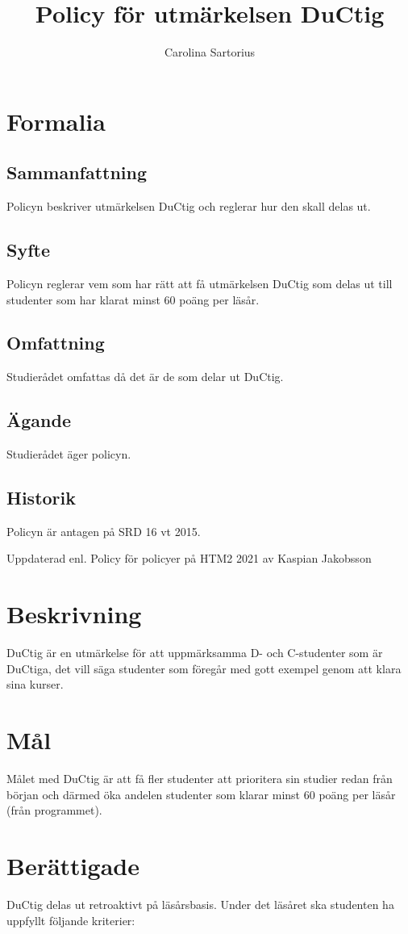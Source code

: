 \documentclass{dsekprotokoll}
\title{Policy för utmärkelsen DuCtig}
\author{Carolina Sartorius}
\begin{document}
\maketitle

\section{Formalia}
\subsection{Sammanfattning}
Policyn beskriver utmärkelsen DuCtig och reglerar hur den skall delas ut.
\subsection{Syfte}
Policyn reglerar vem som har rätt att få utmärkelsen DuCtig som delas ut till studenter som har klarat minst 60 poäng per läsår.
\subsection{Omfattning}
Studierådet omfattas då det är de som delar ut DuCtig.
\subsection{Ägande}
Studierådet äger policyn.
\subsection{Historik}
Policyn är antagen på SRD 16 vt 2015.


Uppdaterad enl. Policy för policyer på HTM2 2021 av Kaspian Jakobsson

\section{Beskrivning}
DuCtig är en utmärkelse för att uppmärksamma D- och C-studenter som är DuCtiga, det vill
säga studenter som föregår med gott exempel genom att klara sina kurser.

\section{Mål}
Målet med DuCtig är att få fler studenter att prioritera sin studier redan från början och därmed
öka andelen studenter som klarar minst 60 poäng per läsår (från programmet).

\section{Berättigade}
DuCtig delas ut retroaktivt på läsårsbasis. Under det läsåret ska studenten ha uppfyllt följande
kriterier:
\end{document}
